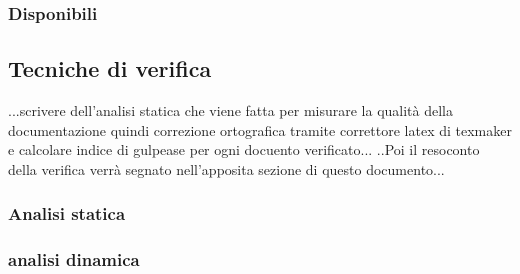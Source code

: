 \subsubsection{Disponibili}
\subsection{Tecniche di verifica}
...scrivere dell'analisi statica che viene fatta per misurare la qualità della documentazione quindi correzione ortografica tramite correttore latex di texmaker e calcolare indice di gulpease per ogni docuento verificato...
..Poi il resoconto della verifica verrà segnato nell'apposita sezione di questo documento...
\subsubsection{Analisi statica}
\subsubsection{analisi dinamica}